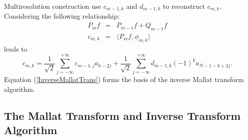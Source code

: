 \documentclass{book}
\begin{document}
Multiresolution construction use $c_{m - 1, k}$ and $d_{m - 1, k}$ to
reconstruct $c_{m, k}$. Considering the following relationship:
\begin{eqnarray*}
  P_m f & = & P_{m - 1} f + Q_{m - 1} f\\
  c_{m, k} & = & \langle P_m f, \phi_{m, k} \rangle
\end{eqnarray*}
leads to
\begin{equation}
  c_{m, k} = \frac{1}{\sqrt{2}} \sum_{j = - \infty}^{+ \infty} c_{m - 1, j}
  a_{k - 2 j} + \frac{1}{\sqrt{2}} \sum_{j = - \infty}^{+ \infty} d_{m - 1, k}
  (- 1)^k a_{N - 1 - k + 2 j} \label{InverseMallatTrans} .
\end{equation}
Equation (\ref{InverseMallatTrans}) forms the basis of the inverse Mallat
transform algorithm.

\subsection{The Mallat Transform and Inverse Transform Algorithm}
\end{document}
